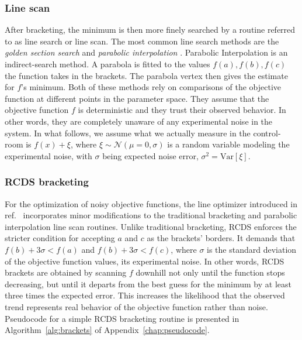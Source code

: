 \subsubsection{Line scan}
After bracketing, the minimum is then more finely searched by a routine referred to as line search or line scan. The most common line search methods are the \textit{golden section search} and \textit{parabolic interpolation} \cite[sections 10.2 and 10.3]{press_numerical_2007}. Parabolic Interpolation is an indirect-search method. A parabola is fitted to the values $f(a), f(b), f(c)$ the function takes in the brackets. The parabola vertex then gives the estimate for $f$'s minimum.
Both of these methods rely on comparisons of the objective function at different points in the parameter space. They assume that the objective function $f$ is deterministic and they trust their observed behavior. In other words, they are completely unaware of any experimental noise in the system. In what follows, we assume what we actually measure in the control-room is $f(x) + \xi$, where $\xi\sim\mathcal{N}(\mu=0, \sigma)$ is a random variable modeling the experimental noise, with $\sigma$ being expected noise error, $\sigma^2 = \text{Var}[\xi]$.

\subsubsection{RCDS bracketing}
For the optimization of noisy objective functions, the line optimizer introduced in ref.~\cite{huang_algorithm_2013} incorporates minor modifications to the traditional bracketing and parabolic interpolation line scan routines. Unlike traditional bracketing, \gls*{RCDS} enforces the stricter condition for accepting $a$ and $c$ as the brackets' borders. It demands that $f(b) + 3\sigma < f(a)$ and $f(b) + 3\sigma < f(c)$, where $\sigma$ is the standard deviation of the objective function values, its experimental noise. In other words, \gls*{RCDS} brackets are obtained by scanning $f$ downhill not only until the function stops decreasing, but until it departs from the best guess for the minimum by at least three times the expected error. This increases the likelihood that the observed trend represents real behavior of the objective function rather than noise. Pseudocode for a simple \gls*{RCDS} bracketing routine is presented in Algorithm~\ref{alg:brackets} of Appendix~\ref{chap:pseudocode}.

